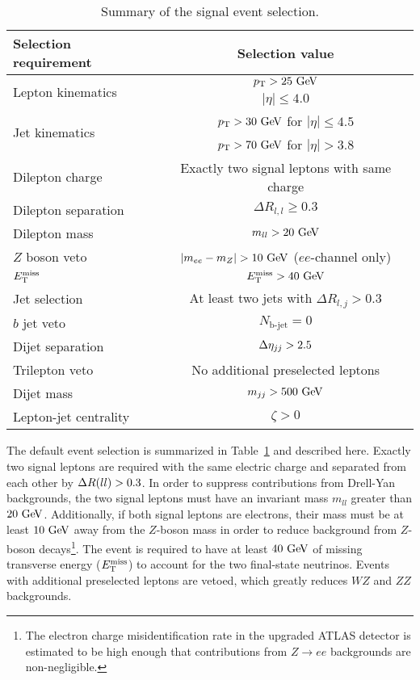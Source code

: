 \begin{table}[htbp]
  \centering
  \begin{tabular}{l|c}
    Selection requirement              & Selection value \\
    \hline\hline
    \multirow{2}{*}{Lepton kinematics} & $\pt > 25\gev$ \\
                                       & $|\eta| \le 4.0$ \\
    \multirow{2}{*}{Jet kinematics}    & $\pt > 30\gev$ for $|\eta| \le 4.5$ \\
                                       & $\pt > 70\gev$ for $|\eta| > 3.8$ \\
    \hline
    Dilepton charge                    & Exactly two signal leptons with same charge\\
    Dilepton separation                & $\Delta R_{l,l} \ge 0.3$ \\
    Dilepton mass                      & $m_{ll} > 20\gev$\\
    $Z$ boson veto                     & $|m_{ee} - m_Z| > 10\gev$ ($ee$-channel only) \\
    $E_{\mathrm{T}}^{\mathrm{miss}}$                             & $\met > 40\gev$ \\
    Jet selection                      & At least two jets with $\Delta R_{l,j} > 0.3$\\
    $b$ jet veto                       & $N_{\textrm{b-jet}} = 0$\\
    Dijet separation                   & $\detajj > 2.5$\\
    Trilepton veto                     & No additional preselected leptons\\
    Dijet mass                         & $m_{jj} > 500\gev$\\
    Lepton-jet centrality              & $\zeta > 0$\\
    \hline
  \end{tabular}
  \caption{Summary of the signal event selection.}
  \label{tab:sswwupgrade_event_selection}
\end{table}

The default event selection is summarized in Table~\ref{tab:sswwupgrade_event_selection} and described here.
Exactly two signal leptons are required with the same electric charge and separated from each other by $\Delta R(ll) > 0.3$.
In order to suppress contributions from Drell-Yan backgrounds, the two signal leptons must have an invariant mass $m_{ll}$ greater than $20\gev$.
Additionally, if both signal leptons are electrons, their mass must be at least $10\gev$ away from the $Z$-boson mass in order to reduce background from $Z$-boson decays\footnote{The electron charge misidentification rate in the upgraded ATLAS detector is estimated to be high enough that contributions from $Z\rightarrow ee$ backgrounds are non-negligible.}.
The event is required to have at least $40\gev$ of missing transverse energy ($E_{\mathrm{T}}^{\mathrm{miss}}$) to account for the two final-state neutrinos.
Events with additional preselected leptons are vetoed, which greatly reduces $WZ$ and $ZZ$ backgrounds.

